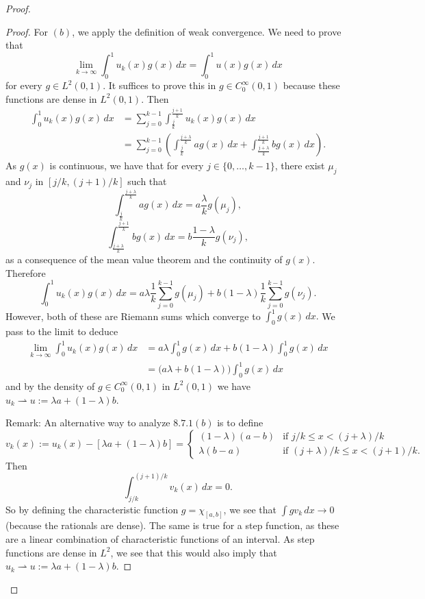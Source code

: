 \documentclass{article}
\begin{document}
\begin{flushleft}
\begin{proof}
\begin{proof}
For $(b)$, we apply the definition of weak convergence. We need to prove that
$$\lim_{k\to\infty}\int_0^1 u_k(x)g(x)\,dx = \int_0^1 u(x)g(x)\,dx$$
for every $g\in L^2(0,1)$. It suffices to prove this in $g\in C_0^{\infty}(0,1)$ because these functions are dense in $L^2(0,1)$. Then
\begin{align*} \int_{0}^{1} u_{k}(x) g(x) \,dx &=
\sum_{j=0}^{k-1} \int_{\frac{j}{k}}^{\frac{j+1}{k}} u_{k}(x) g(x) \,dx\\&= 
\sum_{j=0}^{k-1}
\left(\int_{\frac{j}{k}}^{\frac{j+\lambda}{k}} ag(x) \,dx
 + \int_{\frac{j+\lambda}{k}}^{\frac{j+1}{k}} bg(x)\,dx \right).
  \end{align*}
As $g(x)$ is continuous, we have that for every
$j\in\{0,\dots,k-1\}$, there exist $\mu_j$ and $\nu_j$ in $\left[j/k,(j+1)/k\right]$ such that
$$\int_{\frac{j}{k}}^{\frac{j+\lambda}{k}} ag(x)\,dx = a\frac\lambda kg(\mu_j),$$ 
$$\int_{\frac{j+\lambda}{k}}^{\frac{j+1}{k}} bg(x) \,dx = b\frac{1-\lambda}{k}g(\nu_j),$$
as a consequence of the mean value theorem and the continuity of $g(x)$. Therefore
 $$\int_{0}^{1} u_{k}(x) g(x) \,dx = a\lambda \frac1k\sum_{j=0}^{k-1} g(\mu_j) + b(1-\lambda)\frac1k\sum_{j=0}^{k-1} g(\nu_j).$$
 However, both of these are Riemann sums which converge to $\int_0^1 g(x)\,dx.$ We pass to the limit to deduce
\begin{align*}\lim_{k\to\infty} \int_{0}^{1} u_{k}(x) g(x) \,dx&=
a\lambda\int_0^1 g(x)\,dx +  b(1-\lambda)\int_0^1 g(x)\,dx\\&=
\Big(a\lambda + b(1-\lambda)\Big)\int_0^1 g(x)\,dx 
\end{align*}
 and by the density of $g\in C_0^{\infty}(0,1)$ in $L^2(0,1)$ we have $u_k \rightharpoonup u:=\lambda a + (1-\lambda)b$.
 
Remark: An alternative way to analyze $8.7.1(b)$ is to define
$$v_k(x):= u_k(x) - \left[\lambda a + (1-\lambda)b\right]=
  \begin{cases} 
      (1-\lambda)(a-b) & \text{if $j/k \le x < (j+\lambda)/k$} \\
      \lambda(b-a) & \text{if $(j+\lambda)/k \le x < (j+1)/k$}.
   \end{cases}
$$
Then
$$\int_{j/k}^{(j+1)/k}v_k(x)\,dx = 0.$$
So by defining the characteristic function $g=\chi_{[a,b]}$, we see that $\int gv_k \,dx \to 0 $ (because the rationals are dense). The same is true for a step function, as these are a linear combination of characteristic functions of an interval. As step functions are dense in $L^2$, we see that this would also imply that $u_k \rightharpoonup u:=\lambda a + (1-\lambda)b$.
 



\end{proof}
\end{proof}
\end{flushleft}
\end{document}
